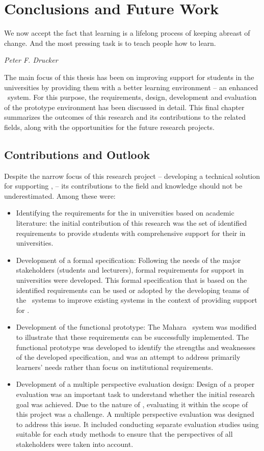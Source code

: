 \chapter{Conclusions and Future Work\label{cha:conclusion}}
\epigraph{We now accept the fact that learning is a lifelong process of keeping
abreast of change. And the most pressing task is to teach people how to
learn.}{\textit{Peter F. Drucker}}
The main focus of this thesis has been on improving \LLLs support for students
in the universities by providing them with a better learning environment -- an
enhanced \ep~system. For this purpose, the requirements, design, development and
evaluation of the prototype environment has been discussed in detail. This final
chapter summarizes the outcomes of this research and its contributions to the
related fields, along with the opportunities for the future research projects.

\section{Contributions and Outlook}

Despite the narrow focus of this research project -- developing a technical
solution for supporting \LLLsn, -- its contributions to the field and knowledge
should not be underestimated. Among these were:
\begin{itemize}
  \item Identifying the requirements for the \LLLs in universities based on
  academic literature: the initial contribution of this research was the set of
  identified requirements to provide students with comprehensive support for
  their \LLLs in universities. 
  
  \item Development of a formal specification: Following the needs of the major
  stakeholders (students and lecturers), formal requirements for \LLLs support
  in universities were developed. This formal specification that is based on the
  identified requirements can be used or adopted by the developing teams of the
  \ep~systems to improve existing systems in the context of providing support
  for \LLLsn.
  
  \item Development of the functional prototype: The Mahara \ep~system was
  modified to illustrate that these requirements can be successfully
  implemented. The functional prototype was developed to identify the strengths
  and weaknesses of the developed specification, and was an attempt to address
  primarily learners' needs rather than focus on institutional requirements.
  
  \item Development of a multiple perspective evaluation design: Design of
  a proper evaluation was an important task to understand whether the initial
  research goal was achieved. Due to the nature of \LLLsn, evaluating it within
  the scope of this project was a challenge. A multiple perspective evaluation
  was designed to address this issue. It included conducting separate evaluation
  studies using suitable for each study methods to ensure that the perspectives
  of all stakeholders were taken into account. 
\end{itemize}

